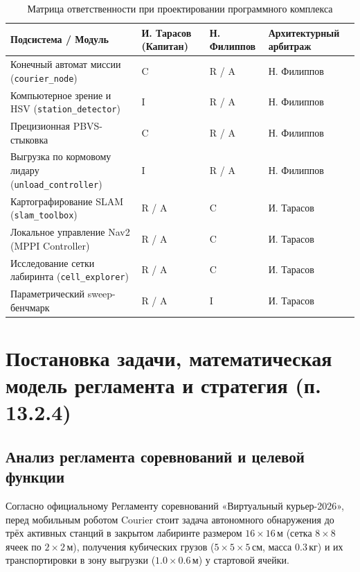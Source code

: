 \documentclass[a4paper,11pt]{article}
\begin{document}
\begin{table}[htbp]
\centering
\small
\begin{tabularx}{\textwidth}{X>{\centering\arraybackslash}p{3.5cm}>{\centering\arraybackslash}p{3.5cm}>{\centering\arraybackslash}p{4.2cm}}
\toprule
\textbf{Подсистема / Модуль} & \textbf{И. Тарасов (Капитан)} & \textbf{Н. Филиппов} & \textbf{Архитектурный арбитраж} \\
\midrule
Конечный автомат миссии (\texttt{courier\_node}) & C & R / A & Н. Филиппов \\
Компьютерное зрение и HSV (\texttt{station\_detector}) & I & R / A & Н. Филиппов \\
Прецизионная PBVS-стыковка & C & R / A & Н. Филиппов \\
Выгрузка по кормовому лидару (\texttt{unload\_controller}) & I & R / A & Н. Филиппов \\
Картографирование SLAM (\texttt{slam\_toolbox}) & R / A & C & И. Тарасов \\
Локальное управление Nav2 (MPPI Controller) & R / A & C & И. Тарасов \\
Исследование сетки лабиринта (\texttt{cell\_explorer}) & R / A & C & И. Тарасов \\
Параметрический sweep-бенчмарк & R / A & I & И. Тарасов \\
\bottomrule
\end{tabularx}
\caption{Матрица ответственности при проектировании программного комплекса}
\label{tab:raci}
\end{table}

\section{Постановка задачи, математическая модель регламента и стратегия (п. 13.2.4)}

\subsection{Анализ регламента соревнований и целевой функции}
Согласно официальному Регламенту соревнований «Виртуальный курьер-2026», перед мобильным роботом Courier стоит задача автономного обнаружения до трёх активных станций в закрытом лабиринте размером $16 \times 16$\,м (сетка $8 \times 8$ ячеек по $2 \times 2$\,м), получения кубических грузов ($5 \times 5 \times 5$\,см, масса $0.3$\,кг) и их транспортировки в зону выгрузки ($1.0 \times 0.6$\,м) у стартовой ячейки.
\end{document}
